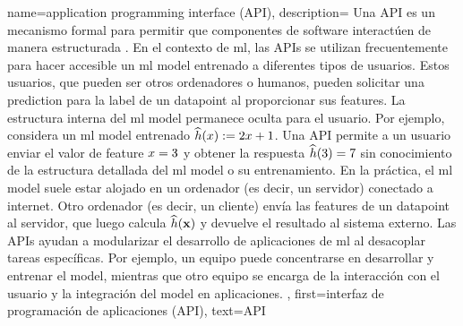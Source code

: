{name={application programming interface (API)},
		description={
			Una  API es un mecanismo formal para permitir 
			que componentes de software interactúen de manera estructurada \cite{RestfulBook2013}. En el 
			contexto de \gls{ml}, las APIs se utilizan frecuentemente para hacer accesible un \gls{ml} \gls{model} 
			entrenado a diferentes tipos de usuarios. Estos usuarios, que pueden ser otros ordenadores 
			o humanos, pueden solicitar una \gls{prediction} para la \gls{label} de un \gls{datapoint} al 
			proporcionar sus \gls{feature}s. La estructura interna del \gls{ml} 
			\gls{model} permanece oculta para el usuario. Por ejemplo, considera un \gls{ml} \gls{model} 
			entrenado $\widehat{h}(x) := 2 x+1$. Una API permite a un usuario 
			enviar el valor de \gls{feature} $x=3$ y obtener la respuesta $\widehat{h}(3)=7$ 
			sin conocimiento de la estructura detallada del \gls{ml} \gls{model} o su entrenamiento. 
			En la práctica, el \gls{ml} \gls{model} suele estar alojado en un ordenador (es decir, un servidor) conectado a internet. 
			Otro ordenador (es decir, un cliente) envía las \gls{feature}s de un \gls{datapoint} al 
			servidor, que luego calcula $\widehat{h}({\bf x})$ y devuelve el 
			resultado al sistema externo. Las APIs ayudan a modularizar el desarrollo de 
			aplicaciones de \gls{ml} al desacoplar tareas específicas. Por ejemplo, un equipo puede 
			concentrarse en desarrollar y entrenar el \gls{model}, mientras que otro equipo se encarga 
			de la interacción con el usuario y la integración del \gls{model} en aplicaciones.
			},
		first={interfaz de programación de aplicaciones (API)},
		text={API}
}





	
